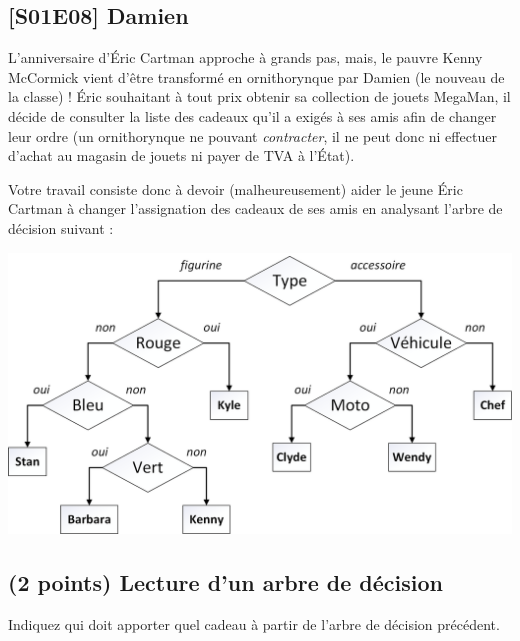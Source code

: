 \documentclass[11pt,a4paper]{article}
\begin{document}
\vfillLast

\clearpage


\subsection*{[S01E08] Damien}

\noindent L'anniversaire d'\'Eric Cartman approche à grands pas, mais, le pauvre Kenny McCormick vient d'être transformé en ornithorynque par Damien (le nouveau de la classe) !
\'Eric souhaitant à tout prix obtenir sa collection de jouets MegaMan, il décide de consulter la liste des cadeaux qu'il a exigés à ses \og amis \fg{} afin de changer leur ordre (un ornithorynque ne pouvant \textit{contracter}, il ne peut donc ni effectuer d'achat au magasin de jouets ni payer de TVA à l'\'Etat).

\noindent Votre travail consiste donc à devoir (malheureusement) aider le jeune \'Eric Cartman à changer l'assignation des cadeaux de ses \og amis \fg{} en analysant l'arbre de décision suivant :

\begin{center}
\includegraphics[scale=0.60]{img/DecisionTree_Cartman_MegaMan.png}
\end{center}


\subsection{(2 points) Lecture d'un arbre de décision}

\noindent Indiquez qui doit apporter quel cadeau à partir de l'arbre de décision précédent.
\end{document}

